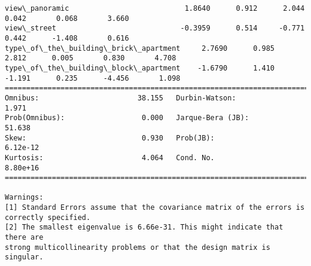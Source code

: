 \documentclass[11pt]{article}
\begin{document}
\begin{Verbatim}[commandchars=\\\{\}]
view\_panoramic                           1.8640      0.912      2.044      0.042       0.068       3.660
view\_street                             -0.3959      0.514     -0.771      0.442      -1.408       0.616
type\_of\_the\_building\_brick\_apartment     2.7690      0.985      2.812      0.005       0.830       4.708
type\_of\_the\_building\_block\_apartment    -1.6790      1.410     -1.191      0.235      -4.456       1.098
==============================================================================
Omnibus:                       38.155   Durbin-Watson:                   1.971
Prob(Omnibus):                  0.000   Jarque-Bera (JB):               51.638
Skew:                           0.930   Prob(JB):                     6.12e-12
Kurtosis:                       4.064   Cond. No.                     8.80e+16
==============================================================================

Warnings:
[1] Standard Errors assume that the covariance matrix of the errors is correctly specified.
[2] The smallest eigenvalue is 6.66e-31. This might indicate that there are
strong multicollinearity problems or that the design matrix is singular.

    \end{Verbatim}
\end{document}
